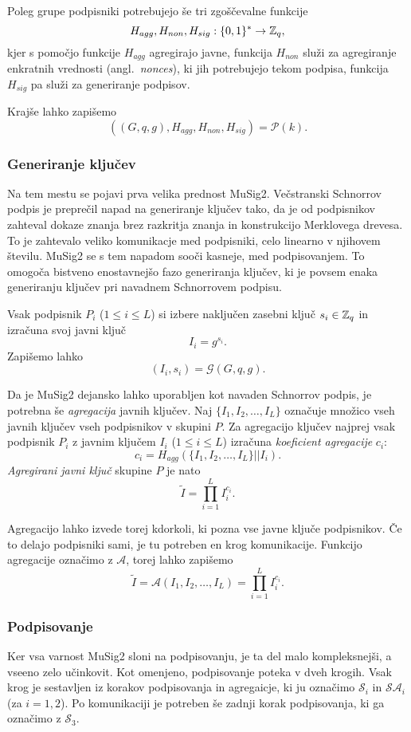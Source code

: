 Poleg grupe podpisniki potrebujejo še tri zgoščevalne funkcije
$$
H_{agg}, H_{non}, H_{sig}:\{0, 1\}^* \rightarrow \mathbb Z_q,
$$
kjer s pomočjo funkcije $H_{agg}$ agregirajo javne, funkcija $H_{non}$ služi za agregiranje enkratnih
vrednosti (angl.\ \textit{nonces}), ki jih potrebujejo tekom podpisa, funkcija $H_{sig}$ pa služi
za generiranje podpisov.

Krajše lahko zapišemo
$$
((G, q, g), H_{agg}, H_{non}, H_{sig}) = \mathcal{P}(k).
$$

\subsubsection{Generiranje ključev}
Na tem mestu se pojavi prva velika prednost MuSig2. Večstranski Schnorrov podpis je preprečil napad
na generiranje ključev tako, da je od podpisnikov zahteval dokaze znanja brez razkritja znanja in
konstrukcijo Merklovega drevesa. To je zahtevalo veliko komunikacje med podpisniki, celo linearno
v njihovem številu. MuSig2 se s tem napadom sooči kasneje, med podpisovanjem. To omogoča bistveno
enostavnejšo fazo generiranja ključev, ki je povsem enaka generiranju ključev pri navadnem
Schnorrovem podpisu.

Vsak podpisnik $P_i$ ($1 \le i \le L$) si izbere naključen zasebni ključ $s_i \in \mathbb Z_q$ in izračuna
svoj javni ključ
$$
I_i = g^{s_i}.
$$
Zapišemo lahko
$$
(I_i, s_i) = \mathcal{G}(G, q, g).
$$

Da je MuSig2 dejansko lahko uporabljen kot navaden Schnorrov podpis, je potrebna še \textit{agregacija}
javnih ključev. Naj $\{I_1, I_2, \dots, I_L\}$ označuje množico vseh javnih ključev vseh podpisnikov v
skupini $P$. Za agregacijo ključev najprej vsak podpisnik $P_i$ z javnim ključem $I_i$ ($1 \le i \le L$)
izračuna \textit{koeficient agregacije} $c_i$:
$$
c_i = H_{agg}(\{I_1, I_2, \dots, I_L\} || I_i).
$$
\textit{Agregirani javni ključ} skupine $P$ je nato
$$
\tilde{I} = \prod_{i=1}^L I_i^{c_i}.
$$

Agregacijo lahko izvede torej kdorkoli, ki pozna vse javne ključe podpisnikov. Če to delajo podpisniki
sami, je tu potreben en krog komunikacije. Funkcijo agregacije označimo z $\mathcal{A}$, torej
lahko zapišemo
$$
\tilde{I} = \mathcal{A}(I_1, I_2, \dots, I_L) = \prod_{i=1}^L I_i^{c_i}.
$$

\subsubsection{Podpisovanje}
Ker vsa varnost MuSig2 sloni na podpisovanju, je ta del malo kompleksnejši, a vseeno zelo učinkovit.
Kot omenjeno, podpisovanje poteka v dveh krogih. Vsak krog je sestavljen iz korakov podpisovanja
in agregaicje, ki ju označimo $\mathcal{S}_i$ in $\mathcal{S}\mathcal{A}_i$ (za $i = 1, 2$). Po
komunikaciji je potreben še zadnji korak podpisovanja, ki ga označimo z $\mathcal{S}_3$.

